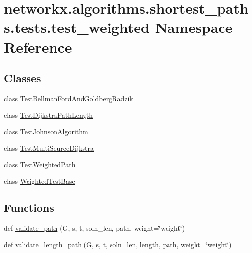 \hypertarget{namespacenetworkx_1_1algorithms_1_1shortest__paths_1_1tests_1_1test__weighted}{}\section{networkx.\+algorithms.\+shortest\+\_\+paths.\+tests.\+test\+\_\+weighted Namespace Reference}
\label{namespacenetworkx_1_1algorithms_1_1shortest__paths_1_1tests_1_1test__weighted}
\subsection*{Classes}
\begin{DoxyCompactItemize}
\item 
class \hyperlink{classnetworkx_1_1algorithms_1_1shortest__paths_1_1tests_1_1test__weighted_1_1TestBellmanFordAndGoldbergRadzik}{Test\+Bellman\+Ford\+And\+Goldberg\+Radzik}
\item 
class \hyperlink{classnetworkx_1_1algorithms_1_1shortest__paths_1_1tests_1_1test__weighted_1_1TestDijkstraPathLength}{Test\+Dijkstra\+Path\+Length}
\item 
class \hyperlink{classnetworkx_1_1algorithms_1_1shortest__paths_1_1tests_1_1test__weighted_1_1TestJohnsonAlgorithm}{Test\+Johnson\+Algorithm}
\item 
class \hyperlink{classnetworkx_1_1algorithms_1_1shortest__paths_1_1tests_1_1test__weighted_1_1TestMultiSourceDijkstra}{Test\+Multi\+Source\+Dijkstra}
\item 
class \hyperlink{classnetworkx_1_1algorithms_1_1shortest__paths_1_1tests_1_1test__weighted_1_1TestWeightedPath}{Test\+Weighted\+Path}
\item 
class \hyperlink{classnetworkx_1_1algorithms_1_1shortest__paths_1_1tests_1_1test__weighted_1_1WeightedTestBase}{Weighted\+Test\+Base}
\end{DoxyCompactItemize}
\subsection*{Functions}
\begin{DoxyCompactItemize}
\item 
def \hyperlink{namespacenetworkx_1_1algorithms_1_1shortest__paths_1_1tests_1_1test__weighted_a4357a54da181ca844c68a040f57c1dc7}{validate\+\_\+path} (G, s, t, soln\+\_\+len, path, weight=\char`\"{}weight\char`\"{})
\item 
def \hyperlink{namespacenetworkx_1_1algorithms_1_1shortest__paths_1_1tests_1_1test__weighted_a3dd661424e82054daf5d8c90832fe8f7}{validate\+\_\+length\+\_\+path} (G, s, t, soln\+\_\+len, length, path, weight=\char`\"{}weight\char`\"{})
\end{DoxyCompactItemize}


